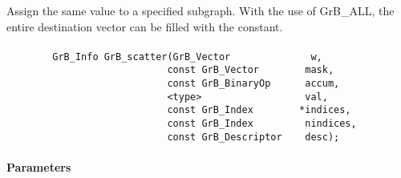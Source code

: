 Assign the same value to a specified subgraph.  With the use of {\sf GrB\_ALL}, the 
entire destination vector can be filled with the constant.

\paragraph{\syntax}

\begin{verbatim}
        GrB_Info GrB_scatter(GrB_Vector              w,
                            const GrB_Vector        mask,
                            const GrB_BinaryOp      accum,
                            <type>                  val,
                            const GrB_Index        *indices,
                            const GrB_Index         nindices,
                            const GrB_Descriptor    desc);
\end{verbatim}

\paragraph{Parameters}

